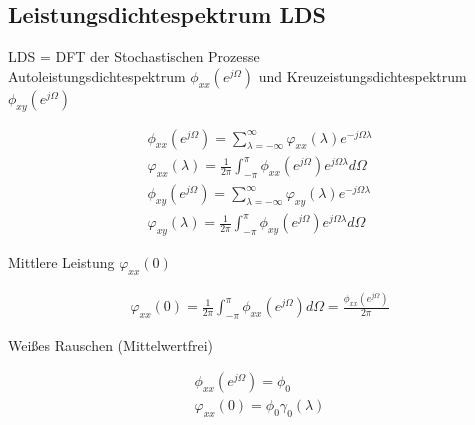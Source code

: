 \documentclass[10pt,a4paper]{article}
\begin{document}
\subsection{Leistungsdichtespektrum LDS}
LDS = DFT der Stochastischen Prozesse \\
Autoleistungsdichtespektrum  $\phi_{xx}(e^{j\Omega})$ und Kreuzeistungsdichtespektrum $\phi_{xy}(e^{j\Omega})$
  \begin{mdframed}[style=exercise]
    \begin{align}
        \phi_{xx}(e^{j\Omega}) = \sum_{\lambda=-\infty}^{\infty} \varphi_{xx}(\lambda) e^{-j\Omega\lambda} \\
        \varphi_{xx}(\lambda) = \frac{1}{2\pi} \displaystyle\int_{-\pi}^{\pi} \phi_{xx}(e^{j\Omega})e^{j\Omega\lambda}d\Omega \\
        \phi_{xy}(e^{j\Omega}) = \sum_{\lambda=-\infty}^{\infty} \varphi_{xy}(\lambda) e^{-j\Omega\lambda} \\
        \varphi_{xy}(\lambda) = \frac{1}{2\pi} \displaystyle\int_{-\pi}^{\pi} \phi_{xy}(e^{j\Omega})e^{j\Omega\lambda}d\Omega
    \end{align}
  \end{mdframed}
Mittlere Leistung $\varphi_{xx}(0)$
  \begin{mdframed}[style=exercise]
    \begin{align}
        \varphi_{xx}(0) = \frac{1}{2\pi} \displaystyle\int_{-\pi}^{\pi} \phi_{xx}(e^{j\Omega})d\Omega  = \frac{\phi_{xx}(e^{j\Omega})}{2\pi}
    \end{align}
  \end{mdframed}
Weißes Rauschen (Mittelwertfrei)
  \begin{mdframed}[style=exercise]
    \begin{align}
        \phi_{xx}(e^{j\Omega}) = \phi_0\\
        \varphi_{xx}(0) = \phi_0 \gamma_0(\lambda)
    \end{align}
  \end{mdframed}
\end{document}
